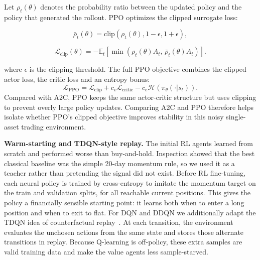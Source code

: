 \documentclass[11pt,twocolumn]{article}
\begin{document}
Let $\rho_t(\theta)$ denotes the probability ratio between the updated policy and the policy that generated the rollout. PPO optimizes the clipped surrogate loss:

\begin{equation}
  \bar{\rho}_t(\theta)
  =
  \mathrm{clip}\!\left(
  \rho_t(\theta), 1-\epsilon, 1+\epsilon
  \right),
\end{equation}

\vspace{-18pt}
\begin{equation}
  \mathcal{L}_{\text{clip}}(\theta)
  =
  -\mathbb{E}_t
  \left[
  \min
  \left(
  \rho_t(\theta) A_t,\,
  \bar{\rho}_t(\theta) A_t
  \right)
  \right].
\end{equation}


where $\epsilon$ is the clipping threshold. The full PPO objective combines the clipped actor loss, the critic loss and an entropy bonus:
\begin{equation}
  \mathcal{L}_{\text{PPO}}
  =
  \mathcal{L}_{\text{clip}}
  + c_v \mathcal{L}_{\text{critic}}
  - c_e \mathcal{H}\!\left(\pi_\theta(\cdot|s_t)\right).
\end{equation}
Compared with A2C, PPO keeps the same actor-critic structure but uses clipping to prevent overly large policy updates. Comparing A2C and PPO therefore helps isolate whether PPO's clipped objective improves stability in this noisy single-asset trading environment.

\textbf{Warm-starting and TDQN-style replay.}
The initial RL agents learned from scratch and performed worse than buy-and-hold. Inspection showed that the best classical baseline was the simple 20-day momentum rule, so we used it as a teacher rather than pretending the signal did not exist. Before RL fine-tuning, each neural policy is trained by cross-entropy to imitate the momentum target on the train and validation splits, for all reachable current positions. This gives the policy a financially sensible starting point: it learns both when to enter a long position and when to exit to flat. For DQN and DDQN we additionally adapt the TDQN idea of counterfactual replay~\cite{theate2021}. At each transition, the environment evaluates the unchosen actions from the same state and stores those alternate transitions in replay. Because Q-learning is off-policy, these extra samples are valid training data and make the value agents less sample-starved.
\end{document}
